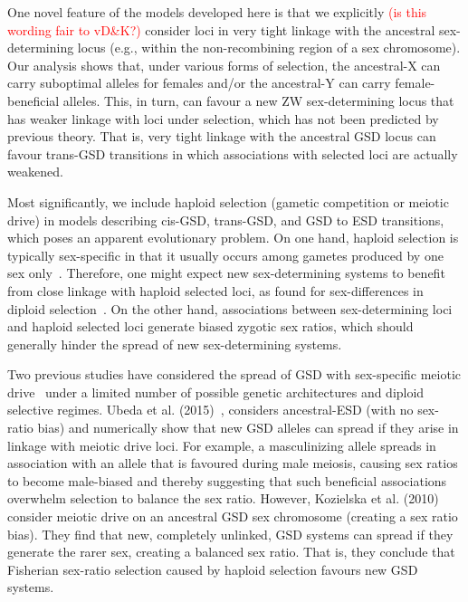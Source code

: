 \documentclass[10pt,letterpaper]{article}
\begin{document}
One novel feature of the models developed here is that we explicitly \textcolor{red}{(is this wording fair to vD\&K?)} consider loci in very tight linkage with the ancestral sex-determining locus (e.g., within the non-recombining region of a sex chromosome). %
Our analysis shows that, under various forms of selection, the ancestral-X can carry suboptimal alleles for females and/or the ancestral-Y can carry female-beneficial alleles. 
This, in turn, can favour a new ZW sex-determining locus that has weaker linkage with loci under selection, which has not been predicted by previous theory. 
That is, very tight linkage with the ancestral GSD locus can favour trans-GSD transitions in which associations with selected loci are actually weakened. 

Most significantly, we include haploid selection (gametic competition or meiotic drive) in models describing cis-GSD, trans-GSD, and GSD to ESD transitions, which poses an apparent evolutionary problem. 
On one hand, haploid selection is typically sex-specific in that it usually occurs among gametes produced by one sex only~\cite{Mulcahy:1996ha,JOSEPH:2004haa,Ubeda:2005gw,Lindholm:2016cw}. 
Therefore, one might expect new sex-determining systems to benefit from close linkage with haploid selected loci, as found for sex-differences in diploid selection~\cite{vanDoorn:2007eu,vanDoorn:2010hu, Muralidhar2018}. 
On the other hand, associations between sex-determining loci and haploid selected loci generate biased zygotic sex ratios, which should generally hinder the spread of new sex-determining systems. 

Two previous studies have considered the spread of GSD with sex-specific meiotic drive~\cite{Kozielska:2010vm,Ubeda:2015fx} under a limited number of possible genetic architectures and diploid selective regimes. 
Ubeda et al. (2015)~\cite{Ubeda:2015fx}, considers ancestral-ESD (with no sex-ratio bias) and numerically show that new GSD alleles can spread if they arise in linkage with meiotic drive loci. 
For example, a masculinizing allele spreads in association with an allele that is favoured during male meiosis, causing sex ratios to become male-biased and thereby suggesting that such beneficial associations overwhelm selection to balance the sex ratio. 
However, Kozielska et al. (2010)~\cite{Kozielska:2010vm} consider meiotic drive on an ancestral GSD sex chromosome (creating a sex ratio bias). 
They find that new, completely unlinked, GSD systems can spread if they generate the rarer sex, creating a balanced sex ratio. 
That is, they conclude that Fisherian sex-ratio selection caused by haploid selection favours new GSD systems. 
\end{document}
